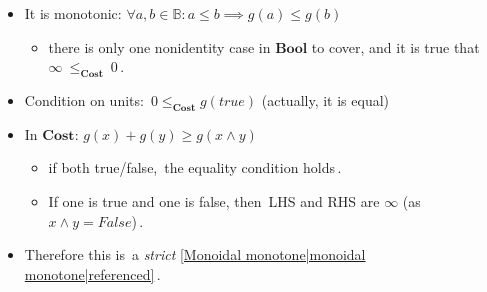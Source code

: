 \begin{itemize}
    \item  It is monotonic:  $\forall a,b \in \mathbb{B}: a\leq b \implies g(a)\leq g(b)$
          \begin{itemize}
            \item there is only one nonidentity case in $\mathbf{Bool}$ to cover, and it is true that \,$\infty\ \leq_\mathbf{Cost}\ 0$\,.
          \end{itemize}
    \item Condition on units: \,$0 \leq_\mathbf{Cost} g(true)$ (actually, it is equal)\,
    \item In $\mathbf{Cost}$: $g(x) + g(y) \geq g(x \land y)$
          \begin{itemize}
            \item if both true/false, \,the equality condition holds\,.
            \item If one is true and one is false, then \,LHS and RHS are $\infty$ (as $x \land y = False$)\,.
          \end{itemize}
    \item Therefore this is \,a \emph{strict} \ref{Monoidal monotone|monoidal monotone|referenced}\,.

  \end{itemize}
